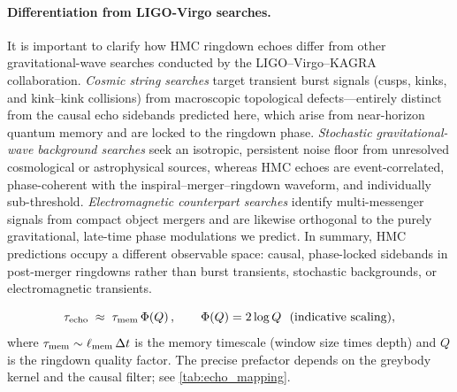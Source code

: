 \documentclass[a4paper,11pt]{article}
\theoremstyle{plain}
\theoremstyle{definition}
\theoremstyle{remark}
\begin{document}
\paragraph{Differentiation from LIGO-Virgo searches.}
It is important to clarify how HMC ringdown echoes differ from other gravitational-wave searches conducted by the LIGO--Virgo--KAGRA collaboration. \emph{Cosmic string searches} target transient burst signals (cusps, kinks, and kink--kink collisions) from macroscopic topological defects---entirely distinct from the causal echo sidebands predicted here, which arise from near-horizon quantum memory and are locked to the ringdown phase. \emph{Stochastic gravitational-wave background searches} seek an isotropic, persistent noise floor from unresolved cosmological or astrophysical sources, whereas HMC echoes are event-correlated, phase-coherent with the inspiral--merger--ringdown waveform, and individually sub-threshold. \emph{Electromagnetic counterpart searches} identify multi-messenger signals from compact object mergers and are likewise orthogonal to the purely gravitational, late-time phase modulations we predict. In summary, HMC predictions occupy a different observable space: causal, phase-locked sidebands in post-merger ringdowns rather than burst transients, stochastic backgrounds, or electromagnetic transients.

\begin{equation}
\label{eq:echo-delay}
\tau_{\rm echo}\;\approx\; \tau_{\rm mem}\,\Phi(Q)\,,\qquad \Phi(Q)= 2\log Q \ \ \text{(indicative scaling)},
\end{equation}
where \(\tau_{\rm mem}\sim \ell_{\rm mem}\,\Delta t\) is the memory timescale (window size times depth) and \(Q\) is the ringdown quality factor. The precise prefactor depends on the greybody kernel and the causal filter; see \cref{tab:echo_mapping}.
\end{document}
